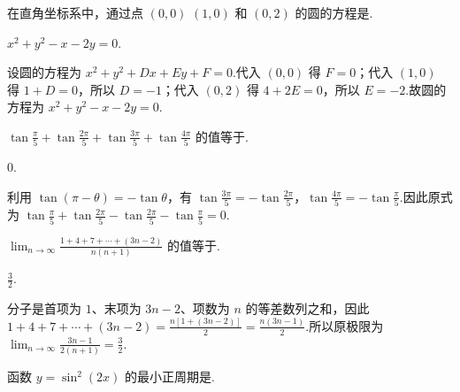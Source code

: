 \begin{problem}

在直角坐标系中，通过点 \((0,0) \) \((1,0) \) 和 \((0,2) \) 的圆的方程是\fillinblank{}.
\end{problem}

\begin{answer}
\(x^{2}+y^{2}-x-2y=0\).
\end{answer}

\begin{solution}
设圆的方程为 \(x^{2}+y^{2}+Dx+Ey+F=0\).代入 \((0,0)\) 得 \(F=0\)；代入 \((1,0)\) 得 \(1+D=0\)，所以 \(D=-1\)；代入 \((0,2)\) 得 \(4+2E=0\)，所以 \(E=-2\).故圆的方程为 \(x^{2}+y^{2}-x-2y=0\).
\end{solution}

\begin{problem}

\(\tan\frac{\pi}{5}+\tan\frac{2\pi}{5}+\tan\frac{3\pi}{5}+\tan\frac{4\pi}{5} \) 的值等于\fillinblank{}.
\end{problem}

\begin{answer}
\(0\).
\end{answer}

\begin{solution}
利用 \(\tan(\pi-\theta)=-\tan\theta\)，有 \(\tan\frac{3\pi}{5}=-\tan\frac{2\pi}{5}\)，\(\tan\frac{4\pi}{5}=-\tan\frac\pi5\).因此原式为 \(\tan\frac\pi5+\tan\frac{2\pi}5-\tan\frac{2\pi}5-\tan\frac\pi5=0\).
\end{solution}

\begin{problem}

\(\displaystyle\lim_{n\to\infty}\frac{1+4+7+\cdots+(3n-2)}{n(n+1)} \) 的值等于\fillinblank{}.
\end{problem}

\begin{answer}
\(\displaystyle \frac{3}{2}\).
\end{answer}

\begin{solution}
分子是首项为 \(1\)、末项为 \(3n-2\)、项数为 \(n\) 的等差数列之和，因此 \(1+4+7+\cdots+(3n-2)=\frac{n[1+(3n-2)]}{2}=\frac{n(3n-1)}2\).所以原极限为 \(\displaystyle\lim_{n\to\infty}\frac{3n-1}{2(n+1)}=\frac32\).
\end{solution}

\begin{problem}

函数 \(y = \sin^2(2x) \) 的最小正周期是\fillinblank{}.
\end{problem}

